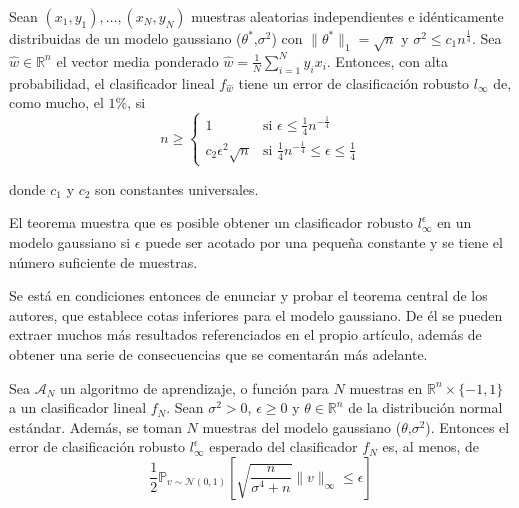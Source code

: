 \begin{teorema}
Sean $(x_1,y_1),\ldots,(x_N,y_N)$ muestras aleatorias independientes e idénticamente distribuidas de un modelo gaussiano ($\theta^*\text{,}\sigma^2$) con $\|\theta^* \|_1=\sqrt{n}$ y $\sigma^2 \leq c_1 n^{\frac{1}{4}}$. Sea $\hat{w} \in \mathbb{R}^n$ el vector media ponderado $\hat{w}=\frac{1}{N} \sum_{i=1}^N y_i x_i$. Entonces, con alta probabilidad, el clasificador lineal $f_{\hat{w}}$ tiene un error de clasificación robusto $l_{\infty}$ de, como mucho, el $1\%$, si
$$n \geq 
\begin{cases} 
1 & \text{si } \epsilon \leq \frac{1}{4}n^{-\frac{1}{4}} \\
c_2 \epsilon^2 \sqrt{n} & \text{si } \frac{1}{4}n^{-\frac{1}{4}} \leq \epsilon \leq \frac{1}{4}
\end{cases}
$$

donde $c_1$ y $c_2$ son constantes universales.
\end{teorema}

El teorema muestra que es posible obtener un clasificador robusto $l_{\infty}^\epsilon$ en un modelo gaussiano si $\epsilon$ puede ser acotado por una pequeña constante y se tiene el número suficiente de muestras.

Se está en condiciones entonces de enunciar y probar el teorema central de los autores, que establece cotas inferiores para el modelo gaussiano. De él se pueden extraer muchos más resultados referenciados en el propio artículo, además de obtener una serie de consecuencias que se comentarán más adelante.

\begin{teorema}
Sea $\mathcal{A}_N$ un algoritmo de aprendizaje, o función para $N$ muestras en $\mathbb{R}^n \times \{-1,1\}$ a un clasificador lineal $f_N$. Sean $\sigma^2 > 0$, $\epsilon \geq 0$ y $\theta \in \mathbb{R}^n$ de la distribución normal estándar. Además, se toman $N$ muestras del modelo gaussiano ($\theta\text{,}\sigma^2$). Entonces el error de clasificación robusto $l_{\infty}^\epsilon$ esperado del clasificador $f_N$ es, al menos, de
$$\frac{1}{2} \mathbb{P}_{v \sim \mathcal{N}(0,1)} \left[ \sqrt{\frac{n}{\sigma^4 + n}} \|v \|_{\infty} \leq \epsilon \right]$$
\end{teorema}

